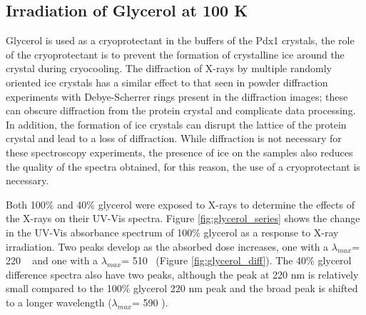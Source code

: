 \subsection{Irradiation of Glycerol at 100 K}
Glycerol is used as a cryoprotectant in the buffers of the Pdx1 crystals, the role of the cryoprotectant is to prevent the formation of crystalline ice around the crystal during cryocooling. The diffraction of X-rays by multiple randomly oriented ice crystals has a similar effect to that seen in powder diffraction experiments with Debye-Scherrer rings present in the diffraction images; these can obscure diffraction from the protein crystal and complicate data processing. In addition, the formation of ice crystals can disrupt the lattice of the protein crystal and lead to a loss of diffraction. While diffraction is not necessary for these spectroscopy experiments, the presence of ice on the samples also reduces the quality of the spectra obtained, for this reason, the use of a cryoprotectant is necessary.  

Both 100\% and 40\% glycerol were exposed to X-rays to determine the effects of the X-rays on their UV-Vis spectra. Figure \ref{fig:glycerol_series} shows the change in the UV-Vis absorbance spectrum of 100\% glycerol as a response to X-ray irradiation. Two peaks develop as the absorbed dose increases, one with a $\lambda _{max}$= 220 \nm~ and one with a $\lambda _{max}$= 510 \nm ~(Figure \ref{fig:glycerol_diff}). The 40\% glycerol difference spectra also have two peaks, although the peak at 220 nm is relatively small compared to the 100\% glycerol 220 nm peak and the broad peak is shifted to a longer wavelength ($\lambda _{max}$= 590 \nm).\par

